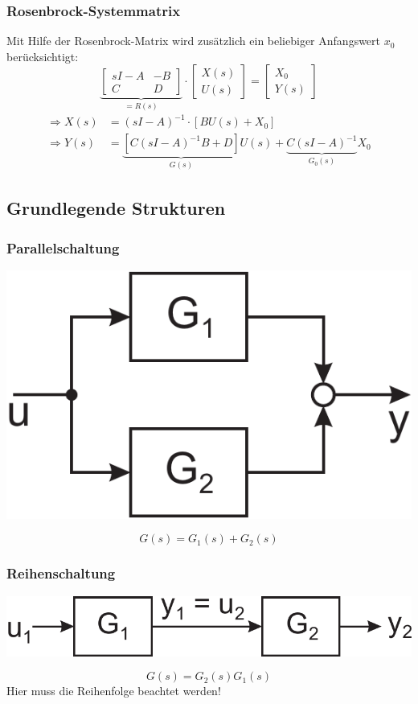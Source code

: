 \documentclass[a4paper,twocolumn,10pt]{article}
\begin{document}
\subsubsection{Rosenbrock-Systemmatrix}
Mit Hilfe der Rosenbrock-Matrix wird zusätzlich ein beliebiger Anfangswert $x_0$ berücksichtigt:
\begin{equation*}
\underbrace{\begin{bmatrix}sI-A & -B \\ C & D\end{bmatrix}}_{=R(s)}\cdot\begin{bmatrix}X(s) \\ U(s)\end{bmatrix}=\begin{bmatrix}X_0 \\ Y(s)\end{bmatrix}
\end{equation*}
\begin{equation*}
\begin{split}
\Rightarrow X(s)&=(sI-A)^{-1}\cdot[BU(s)+X_0]\\
\Rightarrow Y(s)&=\underbrace{\left[C(sI-A)^{-1}B+D\right]}_{G(s)}U(s)+\underbrace{C(sI-A)^{-1}}_{G_0(s)}X_0
\end{split}
\end{equation*}

\subsection{Grundlegende Strukturen}
\subsubsection{Parallelschaltung}
\begin{center}
\includegraphics[width=0.5\columnwidth]{Grafiken/Parallelschaltung}
\end{center}
\begin{equation*}
G(s)=G_1(s)+G_2(s)
\end{equation*}

\subsubsection{Reihenschaltung}
\begin{center}
\includegraphics[width=0.8\columnwidth]{Grafiken/Reihenschaltung}
\end{center}
\begin{equation*}
G(s)=G_2(s)G_1(s)
\end{equation*}
Hier muss die Reihenfolge beachtet werden!
\end{document}
